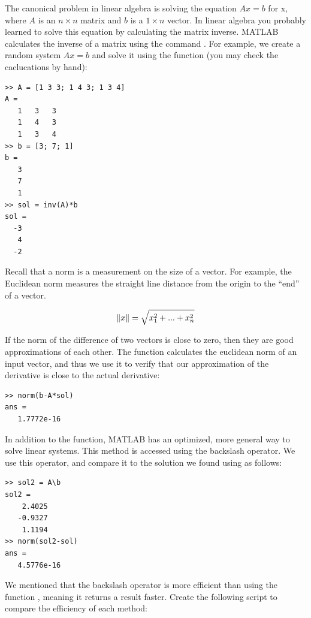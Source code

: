The canonical problem in linear algebra is solving the equation $Ax = b$ for x, where $A$ is an $n \times n$ matrix and $b$ is a  $1 \times n$ vector. In linear algebra you probably learned to solve this equation by calculating the matrix inverse. MATLAB calculates the inverse of a matrix using the command . For example, we create a random system $Ax =b$ and solve it using the  function (you may check the caclucations by hand):

\begin{lstlisting}[style=matlab]
>> A = [1 3 3; 1 4 3; 1 3 4]
A =
   1   3   3
   1   4   3
   1   3   4
>> b = [3; 7; 1]
b =
   3
   7
   1
>> sol = inv(A)*b
sol =
  -3
   4
  -2
\end{lstlisting}

Recall that a norm is a measurement on the size of a vector.  For example, the Euclidean norm measures the straight line distance from the origin to the ``end'' of a vector.

\[
\lVert x\rVert = \sqrt{x_1^2 + ... + x_n^2}
\]

If the norm of the difference of two vectors is close to zero, then they are good approximations of each other.  The  function calculates the euclidean norm of an input vector, and thus we use it to verify that our approximation of the derivative is close to the actual derivative:

\begin{lstlisting}[style=matlab]
>> norm(b-A*sol)
ans =
   1.7772e-16
\end{lstlisting}

In addition to the  function, MATLAB has an optimized, more general way to solve linear systems. This method is accessed using the backslash operator. We use this operator, and compare it to the solution we found using  as follows:

\begin{lstlisting}[style=matlab]
>> sol2 = A\b
sol2 =
    2.4025
   -0.9327
    1.1194
>> norm(sol2-sol)
ans =
   4.5776e-16
\end{lstlisting}

We mentioned that the backslash operator is more efficient than using the function , meaning it returns a result faster. Create the following script to compare the efficiency of each method:

